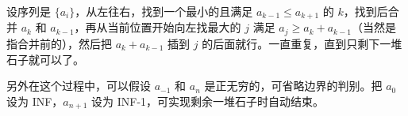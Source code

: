 设序列是 $\{a_i\}$，从左往右，找到一个最小的且满足 $a_{k-1} \le a_{k+1}$ 的 $k$，找到后合并 $a_k$ 和 $a_{k-1}$，再从当前位置开始向左找最大的 $j$ 满足 $a_j \ge a_k + a_{k-1}$（当然是指合并前的），然后把 $a_k + a_{k-1}$ 插到 $j$ 的后面就行。一直重复，直到只剩下一堆石子就可以了。

另外在这个过程中，可以假设 $a_{-1}$ 和 $a_n$ 是正无穷的，可省略边界的判别。把 $a_0$ 设为 INF，$a_{n+1}$ 设为 INF-1，可实现剩余一堆石子时自动结束。
